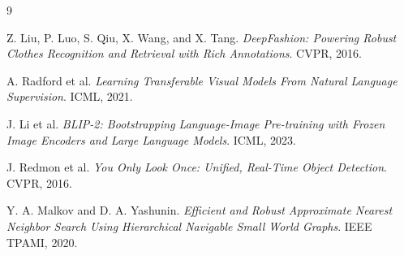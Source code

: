 \documentclass[12pt, a4paper]{article}
\begin{document}
\begin{thebibliography}{9}

Z. Liu, P. Luo, S. Qiu, X. Wang, and X. Tang.
\textit{DeepFashion: Powering Robust Clothes Recognition and Retrieval with Rich Annotations}.
CVPR, 2016.

A. Radford et al.
\textit{Learning Transferable Visual Models From Natural Language Supervision}.
ICML, 2021.

J. Li et al.
\textit{BLIP-2: Bootstrapping Language-Image Pre-training with Frozen Image Encoders and Large Language Models}.
ICML, 2023.

J. Redmon et al.
\textit{You Only Look Once: Unified, Real-Time Object Detection}.
CVPR, 2016.

Y. A. Malkov and D. A. Yashunin.
\textit{Efficient and Robust Approximate Nearest Neighbor Search Using Hierarchical Navigable Small World Graphs}.
IEEE TPAMI, 2020.

\end{thebibliography}
\end{document}
